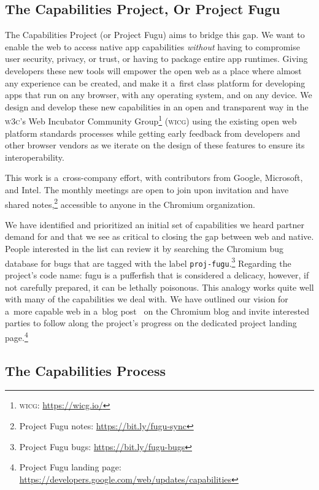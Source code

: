 \documentclass[sigconf]{acmart}
\begin{document}
\subsection{The Capabilities Project, Or Project Fugu}

The Capabilities Project (or Project Fugu) aims to bridge this gap.
We want to enable the web to access native app capabilities
\textit{without} having to compromise user security, privacy, or trust,
or having to package entire app runtimes.
Giving developers these new tools will empower the open web
as a place where almost any experience can be created,
and make it a~first class platform for developing apps that run on any browser,
with any operating system, and on any device.
We design and develop these new capabilities in an open and transparent way
in the \textsc{w3c}'s Web Incubator Community
Group\footnote{\textsc{wicg}: \url{https://wicg.io/}} (\textsc{wicg})
using the existing open web platform standards processes
while getting early feedback from developers and other browser vendors
as we iterate on the design of these features to ensure its interoperability.

This work is a~cross-company effort, with contributors from Google, Microsoft, and Intel.
The monthly meetings are open to join upon invitation
and have shared notes,\footnote{Project Fugu notes:
\url{https://bit.ly/fugu-sync}}
accessible to anyone in the Chromium organization.

We have identified and prioritized an initial set of capabilities
we heard partner demand for and that we see as critical to closing the gap
between web and native.
People interested in the list can review it by searching the Chromium bug database
for bugs that are tagged with the label
\texttt{proj-fugu}.\footnote{Project Fugu bugs: \url{https://bit.ly/fugu-bugs}}
Regarding the project's code name: fugu is a pufferfish that is considered a delicacy, however,  
if not carefully prepared, it can be lethally poisonous. 
This analogy works quite well with many of the capabilities we deal with.
We have outlined our vision for a~more capable web in a~blog post~\cite{lepage18}
on the Chromium blog and invite interested parties to follow along the project's progress
on the dedicated project landing
page.\footnote{Project Fugu landing page:
\url{https://developers.google.com/web/updates/capabilities}}

\subsection{The Capabilities Process}
\end{document}
